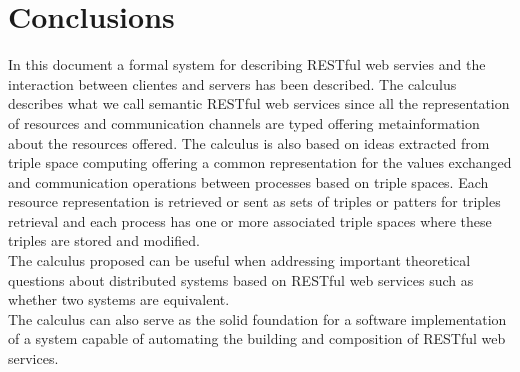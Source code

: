 \section{Conclusions}
In this document a formal system for describing RESTful web servies and the interaction between clientes and servers has been described. The calculus describes what we call semantic RESTful web services since all the representation of resources and communication channels are typed offering metainformation about the resources offered. The calculus is also based on ideas extracted from triple space computing offering a common representation for the values exchanged and communication operations between processes based on triple spaces. Each resource representation is retrieved or sent as sets of triples or patters for triples retrieval and each process has one or more associated triple spaces where these triples are stored and modified.\\
The calculus proposed can be useful when addressing important theoretical questions about distributed systems based on RESTful web services such as whether two systems are equivalent.\\
The calculus can also serve as the solid foundation for a software implementation of a system capable of automating the building and composition of RESTful web services.


